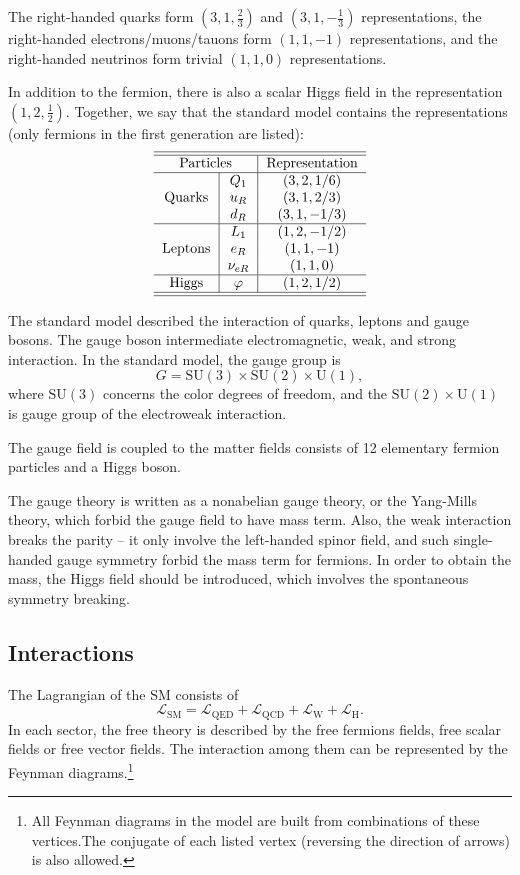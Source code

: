 The right-handed quarks form $\left(3,1,\frac{2}{3}\right)$ and $\left(3,1,-\frac{1}{3}\right)$ representations, the right-handed electrons/muons/tauons form $\left(1,1,-1\right)$ representations, and the right-handed neutrinos form trivial $\left(1,1,0\right)$ representations.

In addition to the fermion, there is also a scalar Higgs field in the representation $\left(1,2,\frac{1}{2}\right)$.
Together, we say that the standard model contains the representations (only fermions in the first generation are listed):
\begin{equation}
\begin{tabular}{c|c|c}
\hline \hline
\multicolumn{2}{c|}{Particles} & Representation\tabularnewline
\hline 
\multirow{3}{*}{Quarks} & $Q_{1}$ & $(3,2,1/6)$\tabularnewline
 & $u_{R}$ & $(3,1,2/3)$\tabularnewline
 & $d_{R}$ & $(3,1,-1/3)$\tabularnewline
\hline 
\multirow{3}{*}{Leptons} & $L_{1}$ & $(1,2,-1/2)$\tabularnewline
 & $e_{R}$ & $(1,1,-1)$\tabularnewline
 & $\nu_{eR}$ & $(1,1,0)$\tabularnewline
\hline 
Higgs & $\varphi$ & $(1,2,1/2)$\tabularnewline
\hline \hline
\end{tabular}
\end{equation}

The standard model described the interaction of quarks, leptons and gauge bosons.
The gauge boson intermediate electromagnetic, weak, and strong interaction.
In the standard model, the gauge group is 
\begin{equation}
	G = \mathrm{SU(3)}\times \mathrm{SU(2)} \times \mathrm{U(1)},
\end{equation}
where $\mathrm{SU(3)}$ concerns the color degrees of freedom, and the $\mathrm{SU(2)}\times \mathrm{U(1)}$ is gauge group of the electroweak interaction.

The gauge field is coupled to the matter fields consists of 12 elementary fermion particles and a Higgs boson.

The gauge theory is written as a nonabelian gauge theory, or the Yang-Mills theory, which forbid the gauge field to have mass term.
Also, the weak interaction breaks the parity -- it only involve the left-handed spinor field, and such single-handed gauge symmetry forbid the mass term for fermions.
In order to obtain the mass, the Higgs field should be introduced, which involves the spontaneous symmetry breaking.


\subsection{Interactions}
The Lagrangian of the SM consists of
\begin{equation}
	\mathcal L_{\mathrm{SM}} = \mathcal L_{\mathrm{QED}} + \mathcal L_{\mathrm{QCD}} + \mathcal L_{\mathrm{W}} + \mathcal L_{\mathrm{H}}.
\end{equation}
In each sector, the free theory is described by the free fermions fields, free scalar fields or free vector fields.
The interaction among them can be represented by the Feynman diagrams.\footnote{All Feynman diagrams in the model are built from combinations of these vertices.The conjugate of each listed vertex (reversing the direction of arrows) is also allowed.}

